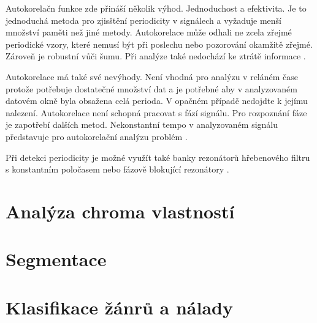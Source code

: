     Autokorelačn funkce zde přináší několik výhod. Jednoduchost a efektivita. Je to jednoduchá metoda pro zjisštění periodicity v signálech a vyžaduje menší množství paměti než jiné metody. Autokorelace může odhali ne zcela zřejmé periodické vzory, které nemusí být při poslechu nebo pozorování okamžitě zřejmé. Zároveň je robustní vůči šumu. Při analýze také nedochází ke ztrátě informace \cite{Tempo_and_metrical_analzsis_by_tracking_multiple_metrical_levels_using_autocorrelation}.
    
    Autokorelace má také své nevýhody. Není vhodná pro analýzu v reláném čase protože potřebuje dostatečné množství dat a je potřebné aby v analyzovaném datovém okně byla obsažena celá perioda. V opačném případě nedojdte k jejímu nalezení. Autokorelace není schopná pracovat s fází signálu. Pro rozpoznání fáze je zapotřebí dalších metod. Nekonstantní tempo v analyzovaném signálu představuje pro autokorelační analýzu problém \cite{Tempo_and_metrical_analzsis_by_tracking_multiple_metrical_levels_using_autocorrelation}.

    Při detekci periodicity je možné využít také banky rezonátorů hřebenového filtru s konstantním poločasem \cite{Tempo_and_beat_analysis_of_acoustic_musical_signals} nebo fázově blokující rezonátory \cite{Resonance_and_the_perciption_of_musical_meter}.



\section{Analýza chroma vlastností} \label{sec:Chroma_vektory}


\section{Segmentace} \label{sec:Segmentace}



\section{Klasifikace žánrů a nálady} \label{sec:Klasifikace_zanru}

